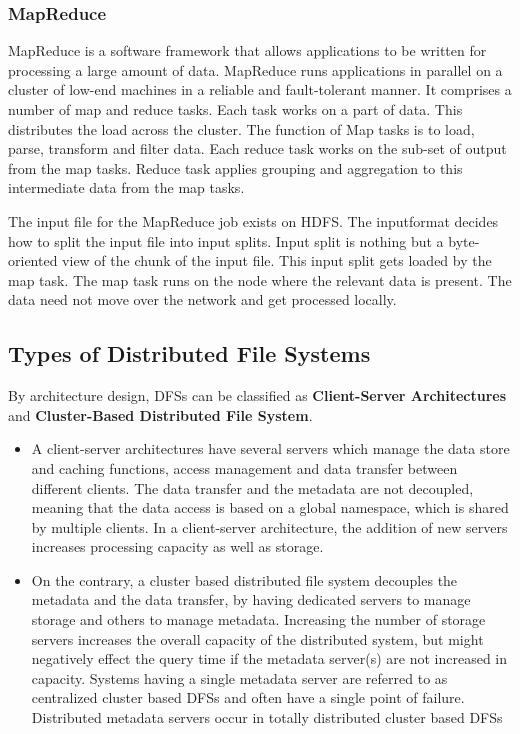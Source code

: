 \documentclass{article}
\begin{document}
\subsubsection{MapReduce}
MapReduce is a software framework that allows applications to be written for processing a large amount of data. MapReduce runs applications in parallel on a cluster of low-end machines in a reliable and fault-tolerant manner. It comprises a number of map and reduce tasks. Each task works on a part of data. This distributes the load across the cluster. The function of Map tasks is to load, parse, transform and filter data. Each reduce task works on the sub-set of output from the map tasks. Reduce task applies grouping and aggregation to this intermediate data from the map tasks.

The input file for the MapReduce job exists on HDFS. The inputformat decides how to split the input file into input splits. Input split is nothing but a byte-oriented view of the chunk of the input file. This input split gets loaded by the map task. The map task runs on the node where the relevant data is present. The data need not move over the network and get processed locally.

\subsection{Types of Distributed File Systems}

By architecture design, DFSs can be classified as \textbf{Client-Server Architectures} and \textbf{Cluster-Based Distributed File System}. 
\begin{itemize}
    \item A client-server architectures have several servers which manage the data store and caching functions, access management and data transfer between different clients. The data transfer and the metadata are not decoupled, meaning that the data access is based on a global namespace, which is shared by multiple clients. In a client-server architecture, the addition of new servers increases processing capacity as well as storage.
    
    \item On the contrary, a cluster based distributed file system decouples the metadata and the data transfer, by having dedicated servers to manage storage and others to manage metadata. Increasing the number of storage servers increases the overall capacity of the distributed system, but might negatively effect the query time if the metadata server(s) are not increased in capacity. Systems having a single metadata server are referred to as centralized cluster based DFSs and often have a single point of failure. Distributed metadata servers occur in totally distributed cluster based DFSs
\end{itemize}
\end{document}
